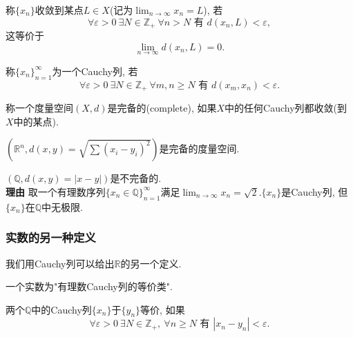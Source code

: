 \begin{definition}
    称$\{ x_n \}$收敛到某点$L \in X$(记为$\displaystyle \lim_{n \to \infty} x_n = L$), 若
    \begin{equation}
      \forall  \varepsilon > 0 \ \exists N \in \mathbb{Z}_{+} \ \forall  n> N \text{ 有 } d(x_n, L) < \varepsilon,
    \end{equation}
    这等价于
    \begin{equation}
      \lim_{n \to \infty} d(x_n, L) = 0.
    \end{equation}
\end{definition}

\begin{definition}
    称$\{ x_n \}_{n=1}^{\infty}$为一个Cauchy列, 若
    \begin{equation}
      \forall \varepsilon > 0 \ \exists N \in \mathbb{Z}_{+} \ \forall  m,n \ge N \text{ 有 } d(x_m,x_n) < \varepsilon.
    \end{equation}
\end{definition}

\begin{definition}
    称一个度量空间$(X,d)$是完备的(complete), 如果$X$中的任何Cauchy列都收敛(到$X$中的某点).
\end{definition}

\begin{example}
    $\left( \mathbb{R}^{n}, d(x,y) = \sqrt{\sum (x_i - y_i)^{2}} \right) $是完备的度量空间.
\end{example}

\begin{example}
    $(\mathbb{Q}, d(x,y) = |x-y|)$是不完备的.
    \\
    \textbf{理由}
    取一个有理数序列$\{ x_n \in \mathbb{Q} \}_{n=1}^{\infty}$满足$\displaystyle \lim_{n \to \infty} x_n = \sqrt{2}$.$\{ x_n \}$是Cauchy列, 但$\{ x_n \}$在$\mathbb{Q}$中无极限.
\end{example}

\subsubsection{实数的另一种定义}
我们用Cauchy列可以给出$\mathbb{R}$的另一个定义.

\begin{definition}
    一个实数为"有理数Cauchy列的等价类".
\end{definition}

\begin{definition}
    两个$\mathbb{Q}$中的Cauchy列$\{ x_n \}$于$\{ y_n \}$等价, 如果
    \begin{equation}
      \forall \varepsilon >0 \ \exists N \in \mathbb{Z}_{+}, \ \forall n \ge N \text{ 有 } |x_n - y_n| < \varepsilon.
    \end{equation}
\end{definition}

